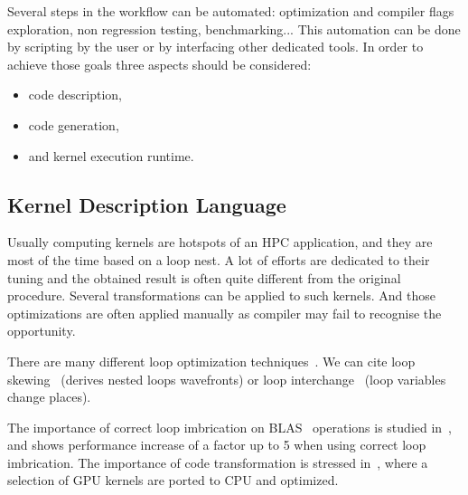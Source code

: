 \documentclass[11pt, a4paper, twoside]{montblanc}
\begin{document}
Several steps in the workflow can be automated: optimization and compiler flags
exploration, non regression testing, benchmarking... This automation can be
done by scripting by the user or by interfacing other dedicated tools. In order
to achieve those goals three aspects should be considered:
\begin{itemize}
\item code description,
\item code generation,
\item and kernel execution runtime.
\end{itemize}


  \subsection{Kernel Description Language}



Usually computing kernels are hotspots of an HPC application, and they are most
of the time based on a loop nest. A lot of efforts are dedicated to their tuning
and the obtained result is often quite different from the original procedure.
Several transformations can be applied to such kernels. And those optimizations
are often applied manually as compiler may fail to recognise the opportunity.

There are many different loop optimization techniques~\cite{wolf1991loop}. We
can cite loop skewing~\cite{wolfe1986loops} (derives nested loops wavefronts)
or loop interchange~\cite{allen1984automatic} (loop variables change places).

The importance of  correct loop imbrication on BLAS~\cite{lawson1979basic}
operations is studied in~\cite{soliman2009performance}, and shows performance
increase of a factor up to 5 when using correct loop imbrication. The importance
of code transformation is stressed in~\cite{ye2011porting}, where a selection of GPU
kernels are ported to CPU and optimized.
\end{document}
